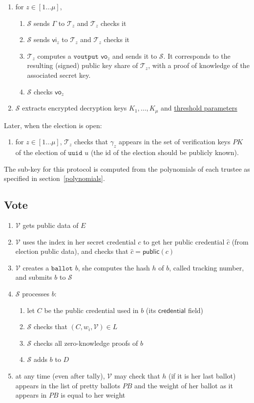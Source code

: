 \documentclass[a4paper]{article}
\newcommand{\public}{\textsf{public}}
\newcommand{\uuid}{\texttt{uuid}}
\newcommand{\ballot}{\texttt{ballot}}
\newcommand{\voutput}{\texttt{voutput}}
\begin{document}
\begin{enumerate}
  all the trustees
\item for $z\in[1\dots \mu]$,
  \begin{enumerate}
  \item $\mathcal{S}$ sends $\Gamma$ to $\mathcal{T}_z$ and $\mathcal{T}_z$ checks it
  \item $\mathcal{S}$ sends $\textsf{vi}_z$ to $\mathcal{T}_z$ and $\mathcal{T}_z$ checks it
  \item $\mathcal{T}_z$ computes a \hyperref[voutputs]{$\voutput$} $\textsf{vo}_z$ and
    sends it to $\mathcal{S}$. It corresponds to the resulting (signed) public
    key share of $\mathcal{T}_z$, with a proof of knowledge of the associated secret key.
  \item $\mathcal{S}$ checks $\textsf{vo}_z$
  \end{enumerate}
\item $\mathcal{S}$ extracts encrypted decryption keys $K_1,\dots,K_\mu$ and
  \hyperref[threshold-params]{threshold parameters}
\end{enumerate}
Later, when the election is open:
\begin{enumerate}
\item for $z\in[1\dots \mu]$, $\mathcal{T}_z$ checks that $\gamma_z$
  appears in the set of verification keys $PK$ of the election of {$\uuid$}
  $u$ (the id of the election should be publicly known).
\end{enumerate}
The sub-key for this protocol is computed from the polynomials of each
trustee as specified in section~\ref{polynomials}.

\subsection{Vote}

\begin{enumerate}
\item $\mathcal{V}$ gets public data of $E$
\item $\mathcal{V}$ uses the index in her secret credential $c$ to get
  her public credential $\hat c$ (from election public data), and checks that
  $\hat c=\public(c)$
\item $\mathcal{V}$ creates a \hyperref[ballots]{$\ballot$} $b$, she
  computes the hash $h$ of $b$, called tracking number, and submits $b$ to $\mathcal{S}$
\item $\mathcal{S}$ processes $b$:
  \begin{enumerate}
  \item let $C$ be the public credential used in $b$ (its
    $\textsf{credential}$ field)
  \item $\mathcal{S}$ checks that $(C,w_i,\mathcal{V})\in L$
  \item $\mathcal{S}$ checks all zero-knowledge proofs of $b$
  \item $\mathcal{S}$ adds $b$ to $D$
  \end{enumerate}
\item at any time (even after tally), $\mathcal{V}$ may check that $h$
  (if it is her last ballot)
  appears in the list of pretty ballots $PB$ and the weight of her
  ballot as it appears in $PB$ is equal to her weight
\end{enumerate}
\end{document}
